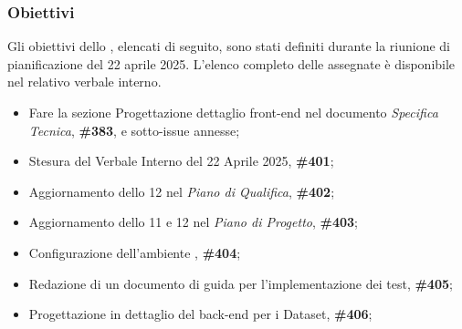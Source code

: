 \subsubsection{Obiettivi}
\label{sec:obiettivi_sprint12}

Gli obiettivi dello , elencati di seguito, sono stati definiti durante la riunione di pianificazione del 22 aprile 2025.
L’elenco completo delle  assegnate è disponibile nel relativo verbale interno.

\begin{itemize}
    \item Fare la sezione Progettazione dettaglio front-end nel documento \textit{Specifica Tecnica},  \textbf{\#383}, e sotto-issue annesse;
    \item Stesura del Verbale Interno del 22 Aprile 2025,  \textbf{\#401};
    \item Aggiornamento dello  12 nel \textit{Piano di Qualifica},  \textbf{\#402};
    \item Aggiornamento dello  11 e 12 nel \textit{Piano di Progetto},  \textbf{\#403};
    \item Configurazione dell'ambiente ,  \textbf{\#404};
    \item Redazione di un documento di guida per l'implementazione dei test,  \textbf{\#405};
    \item Progettazione in dettaglio del back-end per i Dataset,  \textbf{\#406};
\end{itemize}
